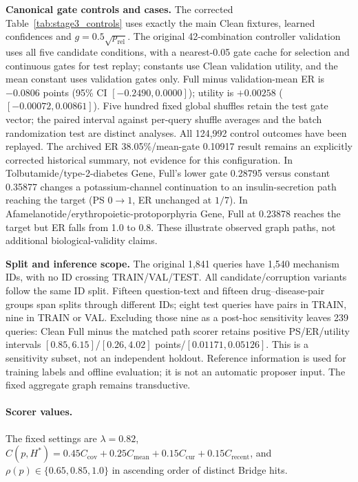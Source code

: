 \documentclass{article} %
\newcommand{\rev}[1]{{\color{blue}#1}}
\begin{document}
\noindent\textbf{Canonical gate controls and cases.} The corrected Table~\ref{tab:stage3_controls} uses exactly the main Clean fixtures, learned confidences and $g=0.5\sqrt{p_{\mathrm{rel}}}$. The original 42-combination controller validation uses all five candidate conditions, with a nearest-0.05 gate cache for selection and continuous gates for test replay; constants use Clean validation utility, and the mean constant uses validation gates only. \rev{Full minus validation-mean ER is $-0.0806$ points (95\% CI $[-0.2490,0.0000]$); utility is $+0.00258$ ($[-0.00072,0.00861]$).} Five hundred fixed global shuffles retain the test gate vector; the paired interval against per-query shuffle averages and the batch randomization test are distinct analyses. \rev{All 124,992 control outcomes have been replayed.} The archived \rev{ER 38.05\%/mean-gate 0.10917} result remains an explicitly corrected historical summary, not evidence for this configuration. In Tolbutamide/type-2-diabetes Gene, Full's lower gate 0.28795 versus constant 0.35877 changes a potassium-channel continuation to an insulin-secretion path reaching the target (\rev{PS $0\rightarrow1$, ER unchanged at $1/7$}). In Afamelanotide/erythropoietic-protoporphyria Gene, Full at 0.23878 reaches the target but \rev{ER falls from 1.0 to 0.8}. These illustrate observed graph paths, not additional biological-validity claims.

\noindent\textbf{Split and inference scope.} The original 1,841 queries have 1,540 mechanism IDs, with no ID crossing TRAIN/VAL/TEST. All candidate/corruption variants follow the same ID split. \rev{Fifteen question-text and fifteen drug--disease-pair groups span splits through different IDs; eight test queries have pairs in TRAIN, nine in TRAIN or VAL.} Excluding those nine as a post-hoc sensitivity leaves 239 queries: \rev{Clean Full minus the matched path scorer retains positive PS/ER/utility intervals $[0.85,6.15]$/$[0.26,4.02]$ points/$[0.01171,0.05126]$. This is a sensitivity subset, not an independent holdout.} Reference information is used for training labels and offline evaluation; it is not an automatic proposer input. The fixed aggregate graph remains transductive.

\paragraph{Scorer values.}
The fixed settings are $\lambda=0.82$, $C(p,H^*)=0.45C_{\mathrm{cov}}+0.25C_{\mathrm{mean}}+0.15C_{\mathrm{cur}}+0.15C_{\mathrm{recent}}$, and $\rho(p)\in\{0.65,0.85,1.0\}$ in ascending order of distinct Bridge hits.
\end{document}
